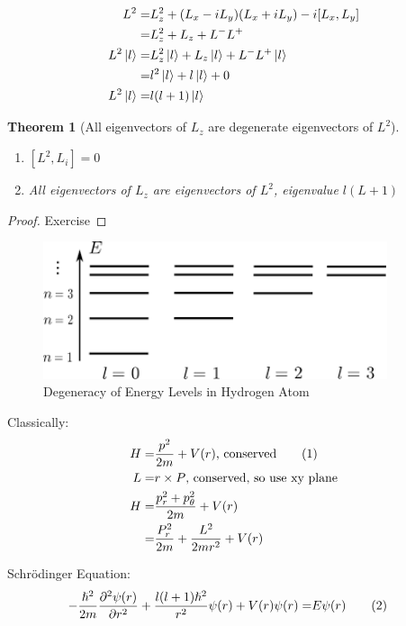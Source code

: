 \documentclass[]{article}
\newcommand\numberthis{\addtocounter{equation}{1}\tag{\theequation}}
\newtheorem{thm}{Theorem}
\begin{document}
\begin{align*}
L^2 =& L_z^2 +(L_x-iL_y)(L_x+iL_y) -i [L_x,L_y]\\
=& L_z^2 + L_z + L^-L^+\\
L^2\ket{l}=& L_z^2\ket{l} + L_z\ket{l} + L^-L^+\ket{l}\\
=& l^2\ket{l} + l\ket{l} + 0\\
L^2\ket{l}=&l (l+1) \ket{l}
\end{align*}

\begin{thm}[All eigenvectors of $L_z$ are degenerate eigenvectors of $L^2$]
	\begin{enumerate}
		\item $[L^2, L_i] =0$
		\item All eigenvectors of $L_z$ are eigenvectors of $L^2$, eigenvalue $l(L+1)$
	\end{enumerate}
\end{thm}
\begin{proof}
	Exercise
\end{proof}

\begin{figure}[H]
	\caption{Degeneracy of Energy Levels in Hydrogen Atom}\label{fig:degeneracy:hydrogen}
	\includegraphics[width=0.9\textwidth]{hydrogen-degeneracy}
\end{figure}
Classically:
\begin{align*}
H =& \frac{p^2}{2m} + V(r) \text{, conserved} \numberthis \label{eq:classical:Hamiltonian}\\
L =& r \times P  \text{, conserved, so use xy plane}\\
H =& \frac{p_r^2+p_{\theta}^2}{2m} +V(r)\\
=& \frac{P_r^2}{2m} + \frac{L^2}{2m r^2} + V(r) 
\end{align*}

Schr\"odinger Equation:
\begin{align*}
-\frac{\hslash^2}{2m}\frac{\partial^2 \psi(r)}{\partial r^2} + \frac{l(l+1)\hslash^2}{r^2}\psi(r)+V(r)\psi(r) =& E\psi(r)\numberthis \label{eq:schroedinger:central}
\end{align*}
\end{document}
